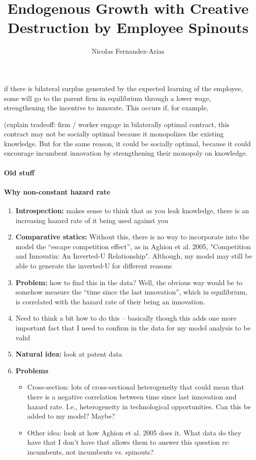 \documentclass[12pt,english]{article}
\theoremstyle{remark}
\begin{document}
	
\title{Endogenous Growth with Creative Destruction by Employee Spinouts}
\author{Nicolas Fernandez-Arias}
\maketitle

if there is bilateral surplus generated by the expected learning of the employee, some will go to the parent firm in equilibrium through a lower wage, strengthening the incentive to innovate. This occurs if, for example, 

(explain tradeoff: firm / worker engage in bilaterally optimal contract, this contract may not be socially optimal because it monopolizes the existing knowledge. But for the same reason, it could be socially optimal, because it could encourage incumbent innovation by strengthening their monopoly on knowledge.

\paragraph{Old stuff}

\paragraph{Why non-constant hazard rate}

\begin{enumerate}
	\item \textbf{Introspection:} makes sense to think that as you leak knowledge, there is an increasing hazard rate of it being used against you
	\item \textbf{Comparative statics:} Without this, there is no way to incorporate into the model the ``escape competition effect'', as in Aghion et al. 2005, "Competition and Innovatin: An Inverted-U Relationship". Although, my model may still be able to generate the inverted-U for different reasons
	\item \textbf{Problem: }how to find this in the data? Well, the obvious way would be to somehow measure the ``time since the last innovation'', which in equilibrium, is correlated with the hazard rate of their being an innovation.
	\item Need to think a bit how to do this -- basically though this adds one more important fact that I need to confirm in the data for my model analysis to be valid
	\item \textbf{Natural idea: }look at patent data
	\item \textbf{Problems}
	\begin{itemize}
		\item Cross-section: lots of cross-sectional heterogeneity that could mean that there is a negative correlation between time since last innovation and hazard rate. I.e., heterogeneity in technological opportunities. Can this be added to my model? Maybe?
		\item Other idea: look at how Aghion et al. 2005 does it. What data do they have that I don't have that allows them to answer this question re: incumbents, not incumbents vs. spinouts?
	\end{itemize}
\end{enumerate}
\end{document}
